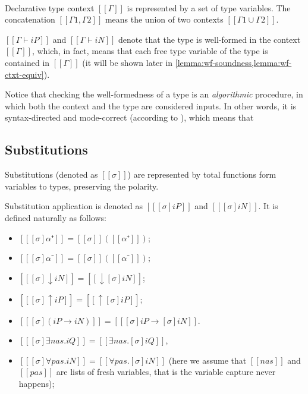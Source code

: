 \documentclass[a4,natbib=false]{article}
\begin{document}
\begin{definition}
  \hfill \\
  Declarative type context $[[Γ]]$ is represented by a set of 
  type variables. The concatenation $[[Γ1, Γ2]]$ means the 
  union of two contexts $[[Γ1 ∪ Γ2]]$.
\end{definition}

$[[Γ ⊢ iP]]$ and $[[Γ ⊢ iN]]$ denote that the type is well-formed in the context $[[Γ]]$,
which, in fact, means that each free type variable of the type is contained in $[[Γ]]$
(it will be shown later in \cref{lemma:wf-soundness,lemma:wf-ctxt-equiv}).

Notice that checking the well-formedness of a type
is an \emph{algorithmic} procedure, in which 
both the context and the type are considered inputs.
In other words, it is syntax-directed and mode-correct 
(according to \cite{dunfieldBidirectionalTyping2020}), 
which means that 

\begin{algorithm}
  \label{alg:wf}
  \hfill
  
  \begin{multicols}{2}
  \ottdefnWFTNiWF{}
  \columnbreak

  \ottdefnWFTPiWF{}
  \end{multicols}

\end{algorithm}


\subsection{Substitutions}

\begin{definition}[Substitution]
  Substitutions (denoted as $[[σ]]$) 
  are represented by total functions form variables to types, preserving the polarity. 
\end{definition}

\begin{algorithm}
  Substitution application is denoted as $[[ [σ]iP ]]$ and $[[ [σ]iN ]]$.
  It is defined naturally as follows:
    \begin{multicols}{2}
      \begin{itemize}
        \item[] $[[ [σ]α⁺ ]] = [[σ]] ([[α⁺]])$;
        \item[] $[[ [σ]α⁻ ]] = [[σ]] ([[α⁻]])$;
        \item[] $[[ [σ]↓iN ]] = [[↓[σ]iN]]$;
        \item[] $[[ [σ]↑iP ]] = [[↑[σ]iP]]$;
        \item[] $[[ [σ](iP → iN) ]] = [[ [σ]iP → [σ]iN ]]$.
        \item[] $[[ [σ]∃nas.iQ ]] = [[∃nas.[σ]iQ]]$, 
        \item[] $[[ [σ]∀pas.iN ]] = [[∀pas.[σ]iN]]$ (here we assume that $[[nas]]$ and $[[pas]]$ are lists of fresh variables, 
          that is the variable capture never happens);
      \end{itemize}
    \end{multicols}
\end{algorithm}
\end{document}
